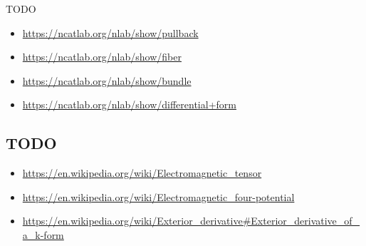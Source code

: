 \documentclass[12pt,letterpaper,titlepage,twoside]{article}
\begin{document}
TODO
\begin{itemize}
  \item \url{https://ncatlab.org/nlab/show/pullback}
  \item \url{https://ncatlab.org/nlab/show/fiber}
  \item \url{https://ncatlab.org/nlab/show/bundle}
  \item \url{https://ncatlab.org/nlab/show/differential+form}
\end{itemize}

\subsection{TODO}

\begin{itemize}
  \item \url{https://en.wikipedia.org/wiki/Electromagnetic_tensor}
  \item \url{https://en.wikipedia.org/wiki/Electromagnetic_four-potential}
  \item \url{https://en.wikipedia.org/wiki/Exterior_derivative#Exterior_derivative_of_a_k-form}
\end{itemize}
\end{document}

